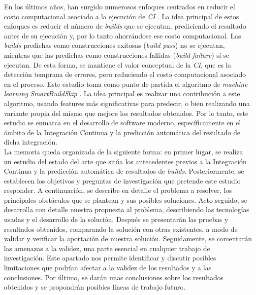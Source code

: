 En los últimos años, han surgido numerosos enfoques centrados en reducir el costo computacional
asociado a la ejecución de \textit{CI} \cite{1,2,4,5,6,7}. La idea principal de estos enfoques es
reducir el número de \textit{builds} que se ejecutan, prediciendo el resultado antes de su
ejecución y, por lo tanto ahorrándose ese costo computacional. Las \textit{builds} predichas como
construcciones exitosas (\textit{build pass}) no se ejecutan, mientras que las predichas como
construcciones fallidas (\textit{build failure}) sí se ejecutan. De esta forma, se mantiene el
valor conceptual de la \textit{CI}, que es la detección temprana de errores, pero reduciendo
el costo computacional asociado en el proceso. Este estudio toma como punto de partida el
algoritmo de \textit{machine learning} \textit{SmartBuildSkip} \cite{2}. La idea principal es
realizar una contribución a este algoritmo, usando features más significativas para predecir, o
bien realizando una variante propia del mismo que mejore los resultados obtenidos. Por lo tanto,
este estudio se enmarca en el desarrollo de software moderno, específicamente en el ámbito de
la Integración Continua y la predicción automática del resultado de dicha integración.\\

La memoria queda organizada de la siguiente forma: en primer lugar, se realiza un estudio del
estado del arte que sitúa los antecedentes previos a la Integración Continua y la predicción
automática de resultados de \textit{builds}. Posteriormente, se establecen los objetivos y
preguntas de investigación que pretende este estudio responder. A continuación, se describe
en detalle el problema a resolver, los principales obstáculos que se plantean y sus posibles
soluciones. Acto seguido, se desarrolla con detalle nuestra propuesta al problema, describiendo
las tecnologías usadas y el desarrollo de la solución. Después se presentarán las pruebas y
resultados obtenidos, comparando la solución con otras existentes, a modo de validar y verificar
la aportación de nuestra solución. Seguidamente, se comentarán las amenazas a la validez, una
parte esencial en cualquier trabajo de investigación. Este apartado nos permite identificar y
discutir posibles limitaciones que podrían afectar a la validez de los resultados y a las
conclusiones. Por último, se darán unas conclusiones sobre los resultados obtenidos y se
propondrán posibles líneas de trabajo futuro.
